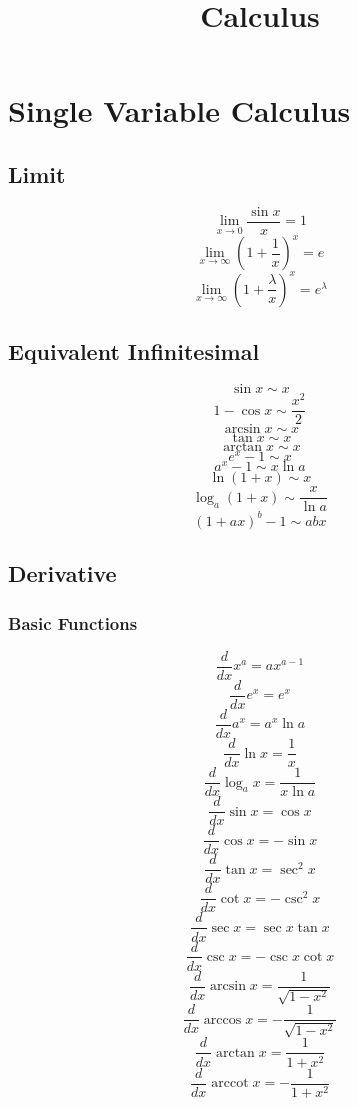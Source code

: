 \documentclass{article}
\title{Calculus}
\date{}
\begin{document}
\maketitle

\tableofcontents

\newpage
\section{Single Variable Calculus}

\subsection{Limit}

\[
    \lim_{x \to 0} \frac{\sin x}{x} = 1
\]
\[
    \lim_{x \to \infty} \left(1 + \frac{1}{x}\right)^x = e
\]
\[
    \lim_{x \to \infty} \left(1 + \frac{\lambda}{x}\right)^x = e^\lambda
\]

\subsection{Equivalent Infinitesimal}

\[
    \sin x \sim x
\]
\[
    1 - \cos x \sim \frac{x^2}{2}
\]
\[
    \arcsin x \sim x
\]
\[
    \tan x \sim x
\]
\[
    \arctan x \sim x
\]
\[
    e^x - 1 \sim x
\]
\[
    a^x - 1 \sim x \ln a
\]
\[
    \ln(1 + x) \sim x
\]
\[
    \log_a(1 + x) \sim \frac{x}{\ln a}
\]
\[
    (1 + ax)^b - 1 \sim abx
\]

\subsection{Derivative}

\subsubsection{Basic Functions}

\[
    \frac{d}{dx} x^a = ax^{a-1}
\]
\[
    \frac{d}{dx} e^x = e^x
\]
\[
    \frac{d}{dx} a^x = a^x \ln a
\]
\[
    \frac{d}{dx} \ln x = \frac{1}{x}
\]
\[
    \frac{d}{dx} \log_a x = \frac{1}{x \ln a}
\]
\[
    \frac{d}{dx} \sin x = \cos x
\]
\[
    \frac{d}{dx} \cos x = -\sin x
\]
\[
    \frac{d}{dx} \tan x = \sec^2 x
\]
\[
    \frac{d}{dx} \cot x = -\csc^2 x
\]
\[
    \frac{d}{dx} \sec x = \sec x \tan x
\]
\[
    \frac{d}{dx} \csc x = -\csc x \cot x
\]
\[
    \frac{d}{dx} \arcsin x = \frac{1}{\sqrt{1 - x^2}}
\]
\[
    \frac{d}{dx} \arccos x = -\frac{1}{\sqrt{1 - x^2}}
\]
\[
    \frac{d}{dx} \arctan x = \frac{1}{1 + x^2}
\]
\[
    \frac{d}{dx} \operatorname{arccot} x = -\frac{1}{1 + x^2}
\]
\end{document}
